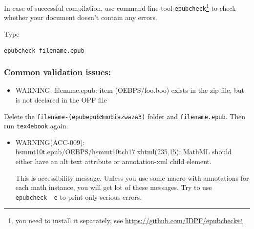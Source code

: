 In case of successful compilation, use command line tool
\texttt{epubcheck}\footnote{you need to install it separately, see
  \url{https://github.com/IDPF/epubcheck}} to check whether your
document doesn't contain any errors.

Type

\begin{verbatim}
epubcheck filename.epub
\end{verbatim}

\hypertarget{common-validation-issues}{%
\subsubsection{Common validation
issues:}\label{common-validation-issues}}

\begin{itemize}
\tightlist
\item
  WARNING: filename.epub: item (OEBPS/foo.boo) exists in the zip file,
  but is not declared in the OPF file
\end{itemize}

Delete the
\texttt{filename-(epub\textbar{}epub3\textbar{}mobi\textbar{}azw\textbar{}azw3)}
folder and \texttt{filename.epub}. Then run \texttt{tex4ebook} again.

\begin{itemize}
\item
  WARNING(ACC-009): hsmmt10t.epub/OEBPS/hsmmt10tch17.xhtml(235,15):
  MathML should either have an alt text attribute or annotation-xml
  child element.

  This is accessibility message. Unless you use some macro with
  annotations for each math instance, you will get lot of these
  messages. Try to use \texttt{epubcheck\ -e} to print only serious
  errors.
\end{itemize}
